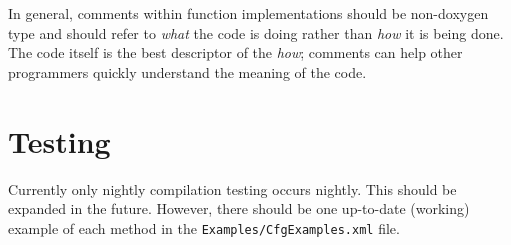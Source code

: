 \documentclass[12pt]{article}
\begin{document}
In general, comments within function implementations should be non-doxygen type
and should refer to \emph{what} the code is doing rather than \emph{how} it is
being done. The code itself is the best descriptor of the \emph{how}; comments
can help other programmers quickly understand the meaning of the code.


\section{Testing}
Currently only nightly compilation testing occurs nightly. This should be
expanded in the future. However, there should be one up-to-date (working)
example of each method in the \texttt{Examples/CfgExamples.xml} file.
\end{document}
